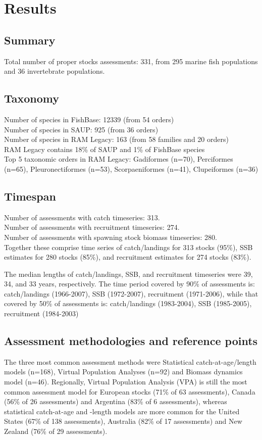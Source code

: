 \section*{Results}
\subsection*{Summary}
\noindent
Total number of proper stocks assessments: 331, from 295 marine fish populations and 36
invertebrate populations.

\subsection*{Taxonomy}
\noindent

Number of species in FishBase: 12339 (from 54 orders) \\
Number of species in SAUP: 925 (from 36 orders)\\
Number of species in RAM Legacy: 163 (from 58 families and 20 orders) \\
RAM Legacy contains 18\% of SAUP and 1\% of FishBase species\\
Top 5 taxonomic orders in RAM Legacy: Gadiformes (n=70), Perciformes (n=65), Pleuronectiformes (n=53), Scorpaeniformes (n=41), Clupeiformes (n=36) \\

\subsection*{Timespan}
\noindent
Number of assessments with catch timeseries: 313.\\
Number of assessments with recruitment timeseries: 274.\\
Number of assessments with spawning stock biomass timeseries: 280.\\

Together these comprise time series of
catch/landings for 313 stocks (95\%),
SSB estimates for 280 stocks (85\%), and recruitment estimates for
274 stocks (83\%).

The median lengths of catch/landings, SSB, and recruitment timeseries
were 39, 34, and 33
years, respectively.  The time period covered by 90\% of assessments
is: catch/landings (1966-2007), SSB
(1972-2007), recruitment (1971-2006), while that
covered by 50\% of assessments is: catch/landings
(1983-2004), SSB (1985-2005), recruitment
(1984-2003)
 
\subsection*{Assessment methodologies and reference points}
\noindent
The three most common assessment methods were
Statistical catch-at-age/length models (n=168), Virtual Population Analyses (n=92) and
Biomass dynamics model (n=46). Regionally, Virtual Population Analysis
(VPA) is still the most common assessment model for European stocks
(71\% of 63 assessments),
Canada (56\% of 26
assessments) and Argentina (83\% of
6 assessments), whereas statistical catch-at-age
and -length models are more common for the United States
(67\% of 138 assessments),
Australia (82\% of 17
assessments) and New Zealand (76\% of
29 assessments).

